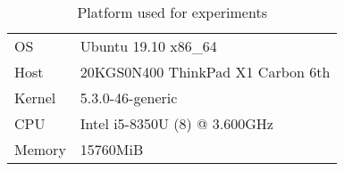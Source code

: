 \begin{table}[h]
    \centering
    \begin{tabular}{ll}
        \hline
        OS     & Ubuntu 19.10 x86\_64              \\
        Host   & 20KGS0N400 ThinkPad X1 Carbon 6th \\
        Kernel & 5.3.0-46-generic                  \\
        CPU    & Intel i5-8350U (8) @ 3.600GHz     \\
        Memory & 15760MiB                          \\
        \hline
    \end{tabular}
    \caption{Platform used for experiments}
    \label{table:laptop}
\end{table}